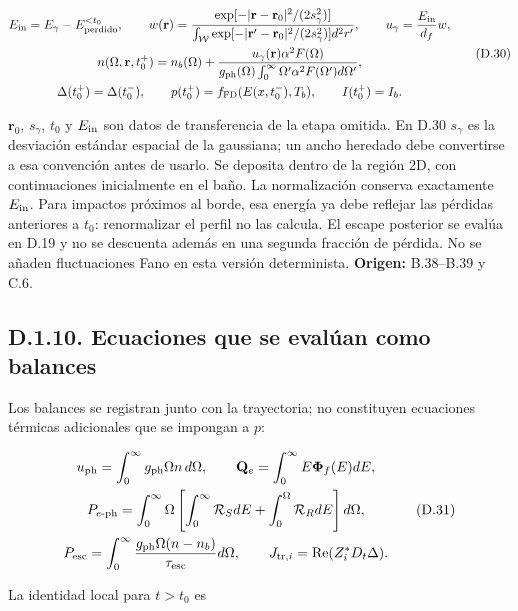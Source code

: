 \documentclass[
  spanish,
  10pt,
  a4paper,
]{article}
\begin{document}
\[
\begin{gathered}
E_{\rm in}=E_\gamma-E_{\rm perdido}^{<t_0},\qquad
w(\mathbf r)=\frac{\exp[-|\mathbf r-\mathbf r_0|^2/(2s_\gamma^2)]}
{\int_{\mathcal W}\exp[-|\mathbf r'-\mathbf r_0|^2/(2s_\gamma^2)]d^2r'},\qquad
u_\gamma=\frac{E_{\rm in}}{d_f}w,\\
n(\Omega,\mathbf r,t_0^+)=n_b(\Omega)
+\frac{u_\gamma(\mathbf r)\alpha^2F(\Omega)}
{g_{\rm ph}(\Omega)\int_0^\infty\Omega'\alpha^2F(\Omega')d\Omega'},\\
\Delta(t_0^+)=\Delta(t_0^-),\qquad
p(t_0^+)=f_{\rm FD}(E(x,t_0^-),T_b),\qquad I(t_0^+)=I_b.
\end{gathered}\tag{D.30}
\]

\(\mathbf r_0\), \(s_\gamma\), \(t_0\) y \(E_{\rm in}\) son datos de
transferencia de la etapa omitida. En D.30 \(s_\gamma\) es la desviación
estándar espacial de la gaussiana; un ancho heredado debe convertirse a
esa convención antes de usarlo. Se deposita dentro de la región 2D, con
continuaciones inicialmente en el baño. La normalización conserva
exactamente \(E_{\rm in}\). Para impactos próximos al borde, esa energía
ya debe reflejar las pérdidas anteriores a \(t_0\): renormalizar el
perfil no las calcula. El escape posterior se evalúa en D.19 y no se
descuenta además en una segunda fracción de pérdida. No se añaden
fluctuaciones Fano en esta versión determinista. \textbf{Origen:}
B.38--B.39 y C.6.

\subsection{D.1.10. Ecuaciones que se evalúan como
balances}\label{d.1.10.-ecuaciones-que-se-evaluxfaan-como-balances}

Los balances se registran junto con la trayectoria; no constituyen
ecuaciones térmicas adicionales que se impongan a \(p\):

\[
\begin{gathered}
u_{\rm ph}=\int_0^\infty g_{\rm ph}\Omega n\,d\Omega,\qquad
\mathbf Q_e=\int_0^\infty E\boldsymbol\Phi_f(E)dE,\\
P_{e\text{-ph}}=\int_0^\infty\Omega
\left[\int_0^\infty\mathcal R_SdE+\int_0^\Omega\mathcal R_RdE\right]d\Omega,\\
P_{\rm esc}=\int_0^\infty\frac{g_{\rm ph}\Omega(n-n_b)}{\tau_{\rm esc}}d\Omega,
\qquad J_{{\rm tr},i}=\operatorname{Re}(Z_i^*D_t\Delta).
\end{gathered}\tag{D.31}
\]

La identidad local para \(t>t_0\) es
\end{document}
